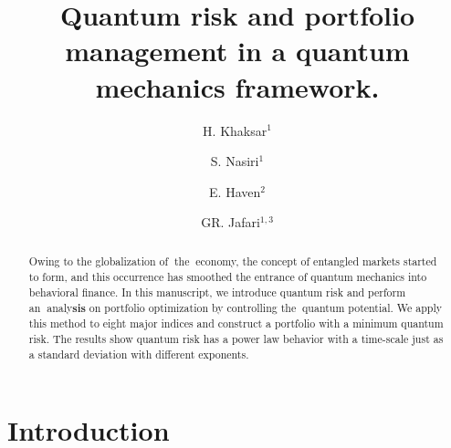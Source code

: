\documentclass[ aip,jmp,reprint]{revtex4-2}
\begin{document}
\title{Quantum risk and portfolio management in \textbf{a }quantum mechanics
framework.}
\author{H. Khaksar$^1$}
\author{S. Nasiri$^1$}
\author{E. Haven$^2$}
\author{GR. Jafari$^{1,3}$}

\begin{abstract}
Owing to the globalization of\textbf{\ }the\textbf{\ }economy, the concept
of entangled markets started to form, and this occurrence has smoothed the
entrance of quantum mechanics into behavioral finance. In this manuscript,
we introduce quantum risk and perform an\textbf{\ }analy\textbf{sis} on
portfolio optimization by controlling the\textbf{\ }quantum potential. We
apply this method to eight major indices and construct a portfolio with a
minimum quantum risk. The results show quantum risk has a power law behavior
with a time-scale just as a standard deviation with different exponents.
\end{abstract}

\maketitle

\address{$1)$ Department of Physics, Shahid Beheshti University, G.C., Evin, Tehran 19839, Iran\\ 
	$2)$ Faculty of Business Administration, Memorial University, St. John's, Canada and IQSCS, UK\\ 
	$3)$ Department of Network and Data Science, Central European University }

\section{Introduction}
\end{document}
